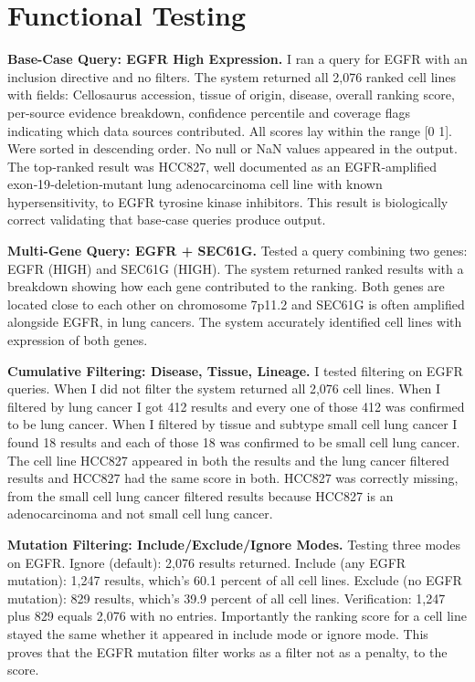 \documentclass[author={Karen Coutinho, Ishaan Bhalla, Aman Raj, Dixit Kaloorani Malarmannan},
                supervisor={Dr. Daniel D'Andrea},
                degree={MSc},
                title={CellSelector Omics: A Multi-Omics Recommendation System for Cell Line Selection},
                subtitle={},
                type={},
                year={2026}]{dissertation}
\begin{document}
\section{Functional Testing}

{\bf Base-Case Query: EGFR High Expression.} I ran a query for EGFR with an inclusion directive and no filters. The system returned all 2,076 ranked cell lines with fields: Cellosaurus accession, tissue of origin, disease, overall ranking score, per-source evidence breakdown, confidence percentile and coverage flags indicating which data sources contributed. All scores lay within the range [0 1]. Were sorted in descending order. No null or NaN values appeared in the output. The top‑ranked result was HCC827, well documented as an EGFR‑amplified exon‑19‑deletion‑mutant lung adenocarcinoma cell line with known hypersensitivity, to EGFR tyrosine kinase inhibitors. This result is biologically correct validating that base‑case queries produce output.

{\bf Multi-Gene Query: EGFR + SEC61G.} Tested a query combining two genes: EGFR (HIGH) and SEC61G (HIGH). The system returned ranked results with a breakdown showing how each gene contributed to the ranking. Both genes are located close to each other on chromosome 7p11.2 and SEC61G is often amplified alongside EGFR, in lung cancers. The system accurately identified cell lines with expression of both genes.

{\bf Cumulative Filtering: Disease, Tissue, Lineage.} I tested filtering on EGFR queries. When I did not filter the system returned all 2,076 cell lines. When I filtered by lung cancer I got 412 results and every one of those 412 was confirmed to be lung cancer. When I filtered by tissue and subtype small cell lung cancer I found 18 results and each of those 18 was confirmed to be small cell lung cancer. The cell line HCC827 appeared in both the results and the lung cancer filtered results and HCC827 had the same score in both. HCC827 was correctly missing, from the small cell lung cancer filtered results because HCC827 is an adenocarcinoma and not small cell lung cancer.

{\bf Mutation Filtering: Include/Exclude/Ignore Modes.} Testing three modes on EGFR. Ignore (default): 2,076 results returned. Include (any EGFR mutation): 1,247 results, which's 60.1 percent of all cell lines. Exclude (no EGFR mutation): 829 results, which's 39.9 percent of all cell lines. Verification: 1,247 plus 829 equals 2,076 with no entries. Importantly the ranking score for a cell line stayed the same whether it appeared in include mode or ignore mode. This proves that the EGFR mutation filter works as a filter not as a penalty, to the score.
\end{document}
